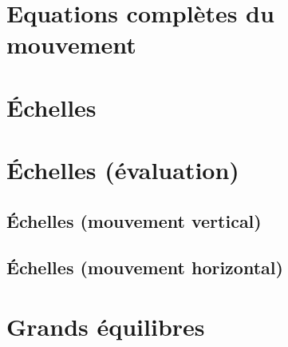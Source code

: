 \documentclass[a4paper,DIV16,10pt]{scrartcl}
\begin{document}
\section{Equations complètes du mouvement}


\newpage 
\section{\'Echelles}


\newpage 
\section{\'Echelles (évaluation)}

	\sk \subsection{\'Echelles (mouvement vertical)}
	

	\sk \subsection{\'Echelles (mouvement horizontal)}
	

\newpage
\section{Grands équilibres}

\end{document}
